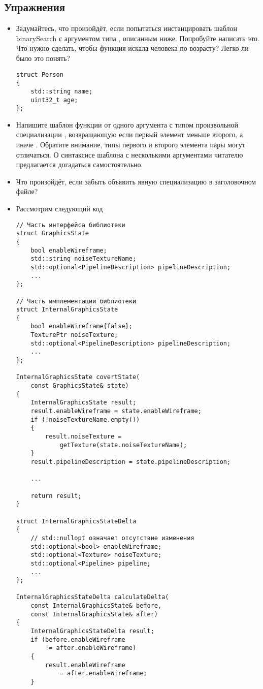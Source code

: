 \subsection*{Упражнения}
\begin{itemize}
\item Задумайтесь, что произойдёт, если попытаться инстанцировать шаблон binarySearch с аргументом типа , описанным ниже. Попробуйте написать это. Что нужно сделать, чтобы функция искала человека по возрасту? Легко ли было это понять?
\begin{verbatim}
struct Person
{
    std::string name;
    uint32_t age;
};
\end{verbatim}
\item Напишите шаблон функции  от одного аргумента с типом произвольной специализации , возвращающую  если первый элемент меньше второго, а иначе . Обратите внимание, типы первого и второго элемента пары могут отличаться. О синтаксисе шаблона с несколькими аргументами читателю предлагается догадаться самостоятельно.
\item Что произойдёт, если забыть объявить явную специализацию в заголовочном файле?
\item Рассмотрим следующий код
\begin{verbatim}
// Часть интерфейса библиотеки
struct GraphicsState
{
    bool enableWireframe;
    std::string noiseTextureName;
    std::optional<PipelineDescription> pipelineDescription;
    ...
};

// Часть имплементации библиотеки
struct InternalGraphicsState
{
    bool enableWireframe{false};
    TexturePtr noiseTexture;
    std::optional<PipelineDescription> pipelineDescription;
    ...
};

InternalGraphicsState covertState(
    const GraphicsState& state)
{
    InternalGraphicsState result;
    result.enableWireframe = state.enableWireframe;
    if (!noiseTextureName.empty())
    {
        result.noiseTexture =
            getTexture(state.noiseTextureName);
    }
    result.pipelineDescription = state.pipelineDescription;

    ...

    return result;
}

struct InternalGraphicsStateDelta
{
    // std::nullopt означает отсутствие изменения
    std::optional<bool> enableWireframe;
    std::optional<Texture> noiseTexture;
    std::optional<Pipeline> pipeline;
    ...
};

InternalGraphicsStateDelta calculateDelta(
    const InternalGraphicsState& before,
    const InternalGraphicsState& after)
{
    InternalGraphicsStateDelta result;
    if (before.enableWireframe
        != after.enableWireframe)
    {
        result.enableWireframe
            = after.enableWireframe;
    }


\end{verbatim}
\end{itemize}

